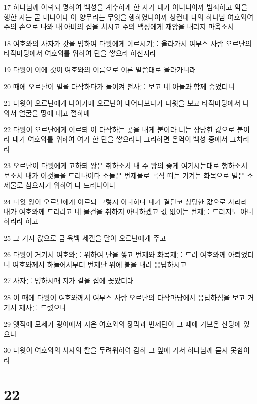 \par 17 하나님께 아뢰되 명하여 백성을 계수하게 한 자가 내가 아니니이까 범죄하고 악을 행한 자는 곧 내니이다 이 양무리는 무엇을 행하였나이까 청컨대 나의 하나님 여호와여 주의 손으로 나와 내 아비의 집을 치시고 주의 백성에게 재앙을 내리지 마옵소서
\par 18 여호와의 사자가 갓을 명하여 다윗에게 이르시기를 올라가서 여부스 사람 오르난의 타작마당에서 여호와를 위하여 단을 쌓으라 하신지라
\par 19 다윗이 이에 갓이 여호와의 이름으로 이른 말씀대로 올라가니라
\par 20 때에 오르난이 밀을 타작하다가 돌이켜 천사를 보고 네 아들과 함께 숨었더니
\par 21 다윗이 오르난에게 나아가매 오르난이 내어다보다가 다윗을 보고 타작마당에서 나와서 얼굴을 땅에 대고 절하매
\par 22 다윗이 오르난에게 이르되 이 타작하는 곳을 내게 붙이라 너는 상당한 값으로 붙이라 내가 여호와를 위하여 여기 한 단을 쌓으리니 그리하면 온역이 백성 중에서 그치리라
\par 23 오르난이 다윗에게 고하되 왕은 취하소서 내 주 왕의 좋게 여기시는대로 행하소서 보소서 내가 이것들을 드리나이다 소들은 번제물로 곡식 떠는 기계는 화목으로 밀은 소제물로 삼으시기 위하여 다 드리나이다
\par 24 다윗 왕이 오르난에게 이르되 그렇지 아니하다 내가 결단코 상당한 값으로 사리라 내가 여호와께 드리려고 네 물건을 취하지 아니하겠고 값 없이는 번제를 드리지도 아니하리라 하고
\par 25 그 기지 값으로 금 육백 세겔을 달아 오르난에게 주고
\par 26 다윗이 거기서 여호와를 위하여 단을 쌓고 번제와 화목제를 드려 여호와께 아뢰었더니 여호와께서 하늘에서부터 번제단 위에 불을 내려 응답하시고
\par 27 사자를 명하시매 저가 칼을 집에 꽂았더라
\par 28 이 때에 다윗이 여호와께서 여부스 사람 오르난의 타작마당에서 응답하심을 보고 거기서 제사를 드렸으니
\par 29 옛적에 모세가 광야에서 지은 여호와의 장막과 번제단이 그 때에 기브온 산당에 있으나
\par 30 다윗이 여호와의 사자의 칼을 두려워하여 감히 그 앞에 가서 하나님께 묻지 못함이라

\chapter{22}

